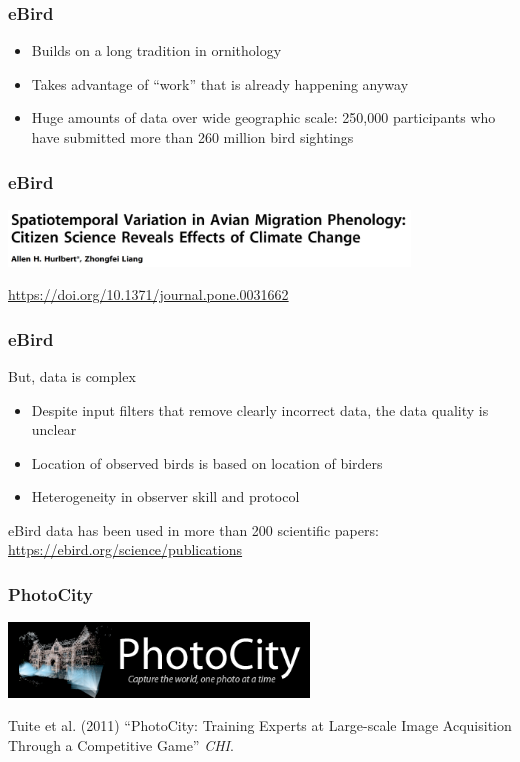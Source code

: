 \documentclass[aspectratio=169]{beamer}
\begin{document}
\begin{frame}
\frametitle{eBird}

\begin{itemize}
\item Builds on a long tradition in ornithology
\pause
\item Takes advantage of ``work'' that is already happening anyway
\pause
\item Huge amounts of data over wide geographic scale: 250,000 participants who have submitted more than 260 million bird sightings
\end{itemize}

\end{frame}
\begin{frame}
\frametitle{eBird}

\begin{center}
\includegraphics[width=0.8\textwidth]{figures/hurlbert_spatiotemporal_2012_title}
\end{center}

\vfill
\url{https://doi.org/10.1371/journal.pone.0031662}
\end{frame}
\begin{frame}
\frametitle{eBird}

But, data is complex
\begin{itemize}
\item Despite input filters that remove clearly incorrect data, the data quality is unclear
\pause
\item Location of observed birds is based on location of birders
\pause
\item Heterogeneity in observer skill and protocol
\end{itemize}

\vfill
\pause
eBird data has been used in more than 200 scientific papers: \url{https://ebird.org/science/publications}

\end{frame}
\begin{frame}
\frametitle{PhotoCity}

\begin{center}
\includegraphics[width=0.6\textwidth]{figures/photocity_logo}
\end{center}

\small{
Tuite et al. (2011) ``PhotoCity: Training Experts at Large-scale Image Acquisition Through a Competitive Game'' \textit{CHI}.
}
\end{frame}
\end{document}
